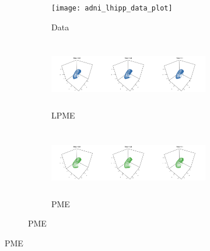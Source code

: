 \documentclass[12pt]{article}
\begin{document}
\begin{figure}

  \begin{subfigure}{\textwidth}
    \label{fig:adni_lhipp_result}
    \begin{subfigure}{\textwidth}
      \centering
      \texttt{[image: adni\_lhipp\_data\_plot]}
      \caption{Data}
    \end{subfigure}
    \begin{subfigure}{\textwidth}
      \centering
      \includegraphics[height=3cm]{adni_lhipp_lpme_isomap_plot}
      \caption{LPME}
    \end{subfigure}
    \begin{subfigure}{\textwidth}
      \centering
      \includegraphics[height=3cm]{adni_lhipp_pme_plot}
      \caption{PME}
    \end{subfigure}
  \end{subfigure}


\end{figure}
\end{document}
